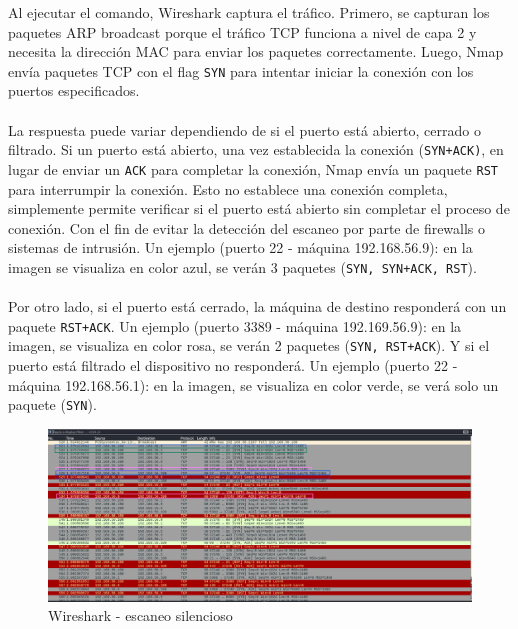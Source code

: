 \documentclass[a4paper,12pt]{article} %
\begin{document}
    Al ejecutar el comando, Wireshark captura el tráfico. Primero, se capturan los paquetes ARP broadcast porque el tráfico TCP funciona a nivel de capa 2 y necesita la dirección MAC para enviar los paquetes correctamente. Luego, Nmap envía paquetes TCP con el flag \texttt{SYN} para intentar iniciar la conexión con los puertos especificados. 
    \\\\
    La respuesta puede variar dependiendo de si el puerto está abierto, cerrado o filtrado. Si un puerto está abierto, una vez establecida la conexión (\texttt{SYN+ACK)}, en lugar de enviar un \texttt{ACK} para completar la conexión, Nmap envía un paquete \texttt{RST} para interrumpir la conexión. Esto no establece una conexión completa, simplemente permite verificar si el puerto está abierto sin completar el proceso de conexión. Con el fin de evitar la detección del escaneo por parte de firewalls o sistemas de intrusión. Un ejemplo (puerto 22 - máquina 192.168.56.9): en la imagen se visualiza en color azul, se verán 3 paquetes (\texttt{SYN, SYN+ACK, RST}).
    \\\\
    Por otro lado, si el puerto está cerrado, la máquina de destino responderá con un paquete \texttt{RST+ACK}. Un ejemplo (puerto 3389 - máquina 192.169.56.9): en la imagen, se visualiza en color rosa, se verán 2 paquetes (\texttt{SYN, RST+ACK}). Y si el puerto está filtrado el dispositivo no responderá. Un ejemplo (puerto 22 - máquina 192.168.56.1): en la imagen, se visualiza en color verde, se verá solo un paquete (\texttt{SYN}).
\newpage
        \begin{figure} [hp!]
         \centering
         \includegraphics[width=1\textwidth]{Imagenes/wiresil.png}
         \caption{Wireshark - escaneo silencioso}
         \label{fig:wireshark2}
        \end{figure}
\end{document}
